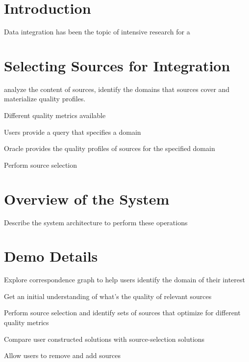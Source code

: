 \documentclass{vldb}
\begin{document}
\section{Introduction}
Data integration has been the topic of intensive research for a

\section{Selecting Sources for Integration}
analyze the content of sources, identify the domains that sources cover and materialize quality profiles. 

Different quality metrics available 

Users provide a query that specifies a domain

Oracle provides the quality profiles of sources for the specified domain

Perform source selection

\section{Overview of the System}

Describe the system architecture to perform these operations

\section{Demo Details}

Explore correspondence graph to help users identify the domain of their interest

Get an initial understanding of what's the quality of relevant sources

Perform source selection and identify sets of sources that optimize for different
quality metrics

Compare user constructed solutions with source-selection solutions

Allow users to remove and add sources



\end{document}
